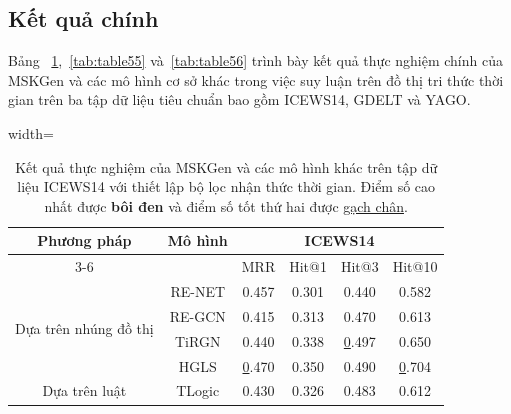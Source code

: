 \subsection{Kết quả chính}

Bảng ~\ref{tab:table54},~\ref{tab:table55} và~\ref{tab:table56} trình bày kết quả thực nghiệm chính của MSKGen và 
các mô hình cơ sở khác trong việc suy luận trên đồ thị tri thức thời gian trên ba tập dữ liệu tiêu chuẩn bao gồm 
ICEWS14, GDELT và YAGO.

\begin{table}[H]
\caption{Kết quả thực nghiệm của MSKGen và các mô hình khác trên tập dữ liệu ICEWS14 với thiết lập bộ lọc nhận thức thời gian. 
Điểm số cao nhất được \textbf{bôi đen} và điểm số tốt thứ hai được \underline{gạch chân}.}
\label{tab:table54}
\begin{adjustbox}{width=\textwidth}
\begin{tabular}{|cc|cccc|}
\hline
\multicolumn{1}{|c|}{\multirow{2}{*}{Phương pháp}}     & \multirow{2}{*}{Mô hình} & \multicolumn{4}{c|}{ICEWS14}                                                                        \\ \cline{3-6} 
\multicolumn{1}{|c|}{}                                 &                          & \multicolumn{1}{c|}{MRR} & \multicolumn{1}{c|}{Hit@1} & \multicolumn{1}{c|}{Hit@3} & Hit@10         \\ \hline
\multicolumn{1}{|c|}{\multirow{4}{*}{Dựa trên nhúng đồ thị}} & RE-NET                   & 0.457                    & 0.301                      & 0.440                      & 0.582          \\ \cline{2-2}
\multicolumn{1}{|c|}{}                                 & RE-GCN                   & 0.415                    & 0.313                      & 0.470                      & 0.613          \\ \cline{2-2}
\multicolumn{1}{|c|}{}                                 & TiRGN                    & 0.440                    & 0.338                      & {\ul 0.497}                & 0.650          \\ \cline{2-2}
\multicolumn{1}{|c|}{}                                 & HGLS                     & {\ul 0.470}              & 0.350                      & 0.490                      & {\ul 0.704}    \\ \hline
\multicolumn{1}{|c|}{Dựa trên luật}                    & TLogic                   & 0.430                    & 0.326                      & 0.483                      & 0.612          \\ \hline

\end{tabular}
\end{adjustbox}
\end{table}
